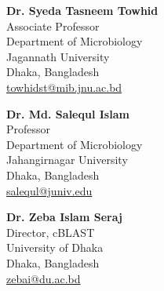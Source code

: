 \documentclass[
  11pt,
  letterpaper,
  DIV=11,
  numbers=noendperiod]{scrartcl}
\begin{document}
\begin{minipage}[t]{0.32\linewidth}
\textbf{Dr. Syeda Tasneem Towhid} \\
Associate Professor \\
Department of Microbiology \\
Jagannath University \\
Dhaka, Bangladesh \\
\href{mailto:towhidst@mib.jnu.ac.bd}{towhidst@mib.jnu.ac.bd}
\end{minipage}
\hfill
\begin{minipage}[t]{0.32\linewidth}
\textbf{Dr. Md. Salequl Islam} \\
Professor \\
Department of Microbiology \\
Jahangirnagar University \\
Dhaka, Bangladesh \\
\href{mailto:salequl@juniv.edu}{salequl@juniv.edu}
\end{minipage}
\hfill
\begin{minipage}[t]{0.32\linewidth}
\textbf{Dr. Zeba Islam Seraj} \\
Director, cBLAST \\
University of Dhaka \\
Dhaka, Bangladesh \\
\href{mailto:zebai@du.ac.bd}{zebai@du.ac.bd}
\end{minipage}
\end{document}
